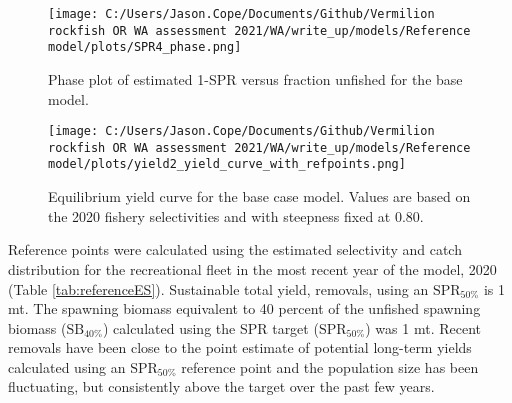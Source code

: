 \documentclass[11pt,
  english,
  a4paper,
]{article}
\begin{document}
\leavevmode\tagmcend\tagstructend\par


\begin{figure}
\centering
\texttt{[image: C:/Users/Jason.Cope/Documents/Github/Vermilion rockfish OR WA assessment 2021/WA/write\_up/models/Reference model/plots/SPR4\_phase.png]}
\caption{Phase plot of estimated 1-SPR versus fraction unfished for the base model.\label{fig:es-phase}}
\end{figure}

\tagmcend\tagstructend


\begin{figure}
\centering
\texttt{[image: C:/Users/Jason.Cope/Documents/Github/Vermilion rockfish OR WA assessment 2021/WA/write\_up/models/Reference model/plots/yield2\_yield\_curve\_with\_refpoints.png]}
\caption{Equilibrium yield curve for the base case model. Values are based on the 2020 fishery selectivities and with steepness fixed at 0.80.\label{fig:es-yield}}
\end{figure}

\tagmcend\tagstructend


Reference points were calculated using the estimated selectivity and catch distribution for the recreational fleet in the most recent year of the model, 2020 (Table \ref{tab:referenceES}). Sustainable total yield, removals, using an {\(\text{SPR}_{50\%}\)\leavevmode\tagmcend\tagstructend} is 1 mt. The spawning biomass equivalent to 40 percent of the unfished spawning biomass ({\(\text{SB}_{40\%}\)\leavevmode\tagmcend\tagstructend}) calculated using the SPR target ({\(\text{SPR}_{50\%}\)\leavevmode\tagmcend\tagstructend}) was 1 mt. Recent removals have been close to the point estimate of potential long-term yields calculated using an {\(\text{SPR}_{50\%}\)\leavevmode\tagmcend\tagstructend} reference point and the population size has been fluctuating, but consistently above the target over the past few years.
\end{document}

